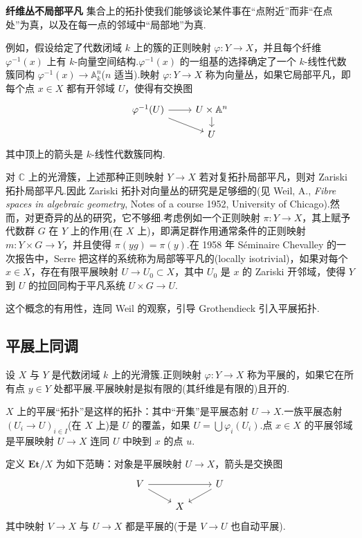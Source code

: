 \textbf{纤维丛不局部平凡} 集合上的拓扑使我们能够谈论某件事在``点附近''而非``在点处''为真，以及在每一点的邻域中``局部地''为真.

例如，假设给定了代数闭域 $k$ 上的簇的正则映射 $\varphi \colon Y \to X$，并且每个纤维 $\varphi^{-1}(x)$ 上有 $k$-向量空间结构.$\varphi^{-1}(x)$ 的一组基的选择确定了一个 $k$-线性代数簇同构 $\varphi^{-1}(x) \to \mathbb{A}^{n}_{k}$($n$ 适当).映射 $\varphi \colon Y \to X$ 称为向量丛，如果它局部平凡，即每个点 $x \in X$ 都有开邻域 $U$，使得有交换图
\[
\begin{tikzcd}[row sep=small]
  \varphi^{-1}(U) \arrow[r] \arrow[rd] & U \times \mathbb{A}^{n} \arrow[d] \\
                                       & U
\end{tikzcd}
\]
其中顶上的箭头是 $k$-线性代数簇同构.

对 $\mathbb{C}$ 上的光滑簇，上述那种正则映射 $Y \to X$ 若对复拓扑局部平凡，则对 Zariski 拓扑局部平凡.因此 Zariski 拓扑对向量丛的研究是足够细的(见 Weil, A., \emph{Fibre spaces in algebraic geometry}, Notes of a course 1952, University of Chicago).然而，对更奇异的丛的研究，它不够细.考虑例如一个正则映射 $\pi \colon Y \to X$，其上赋予代数群 $G$ 在 $Y$ 上的作用(在 $X$ 上)，即满足群作用通常条件的正则映射 $m \colon Y \times G \to Y$，并且使得 $\pi(yg) = \pi(y)$.在 1958 年 S\'eminaire Chevalley 的一次报告中，Serre 把这样的系统称为局部等平凡的(locally isotrivial)，如果对每个 $x \in X$，存在有限平展映射 $U \to U_0 \subset X$，其中 $U_0$ 是 $x$ 的 Zariski 开邻域，使得 $Y$ 到 $U$ 的拉回同构于平凡系统 $U \times G \to U$.

这个概念的有用性，连同 Weil 的观察，引导 Grothendieck 引入平展拓扑.

\subsection*{平展上同调}

设 $X$ 与 $Y$ 是代数闭域 $k$ 上的光滑簇.正则映射 $\varphi \colon Y \to X$ 称为平展的，如果它在所有点 $y \in Y$ 处都平展.平展映射是拟有限的(其纤维是有限的)且开的.

$X$ 上的平展``拓扑''是这样的拓扑：其中``开集''是平展态射 $U \to X$.一族平展态射 $(U_i \to U)_{i \in I}$(在 $X$ 上)是 $U$ 的覆盖，如果 $U = \bigcup \varphi_i(U_i)$.点 $x \in X$ 的平展邻域是平展映射 $U \to X$ 连同 $U$ 中映到 $x$ 的点 $u$.

定义 $\mathbf{Et}/X$ 为如下范畴：对象是平展映射 $U \to X$，箭头是交换图
\[
\begin{tikzcd}[row sep=small]
  V \arrow[rd] \arrow[rr] & & U \arrow[ld] \\
                          & X &
\end{tikzcd}
\]
其中映射 $V \to X$ 与 $U \to X$ 都是平展的(于是 $V \to U$ 也自动平展).

